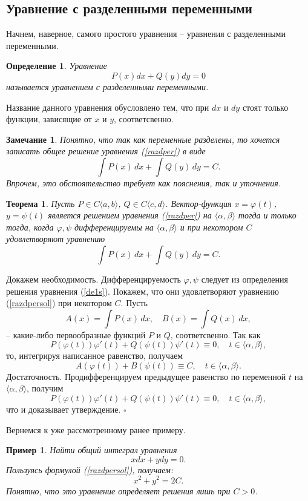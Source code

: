 \documentclass[a4paper,14pt]{extarticle}
\newtheorem{theorem}{Теорема}[subsection]
\newtheorem{definition}{Определение}[subsection]
\newtheorem{example}{Пример}[subsection]
\newtheorem{remark}{Замечание}[subsection]
\newcommand{\be}{\begin{equation}}
\newcommand{\ee}{\end{equation}}
\newcommand{\la}{\label}
\newenvironment{proof}%
{\begin{sloppypar}\noindent{\bf Доказательство.}}%
{\hspace*{\fill}$\square$\end{sloppypar}}
\begin{document}
\subsection{Уравнение с разделенными переменными}
Начнем, наверное, самого простого уравнения -- уравнения с разделенными переменными.
\begin{definition}
Уравнение 
\be\la{razdper}
P(x)dx + Q(y)dy = 0
\ee
называется уравнением с разделенными переменными.
\end{definition}
Название данного уравнения обусловлено тем, что при $dx$ и $dy$ стоят только функции, зависящие от $x$ и $y$, соответсвенно.
\begin{remark}
Понятно, что так как переменные разделены, то хочется записать общее решение уравнения (\ref{razdper}) в виде 
$$
\int P(x) \, dx + \int Q(y) \, dy = C.
$$	
Впрочем, это обстоятельство требует как пояснения, так и уточнения.
\end{remark}
\begin{theorem}
Пусть $P \in C \langle a, b \rangle$, $Q \in C \langle c, d \rangle$. Вектор-функция $x=\varphi(t)$, $y = \psi(t)$ является решением уравнения (\ref{razdper}) на $\langle \alpha, \beta \rangle$ тогда и только тогда, когда $\varphi, \psi$ дифференцируемы на $\langle \alpha, \beta \rangle$ и при некотором $C$ удовлетворяют уравнению
\be\la{razdpersol}
\int P(x) \, dx + \int Q(y) \, dy = C.
\ee	
\end{theorem}
\begin{proof}
Докажем необходимость. Дифференцируемость $\varphi, \psi$ следует из определения решения уравнения (\ref{de1s}). Покажем, что они удовлетворяют уравнению (\ref{razdpersol}) при некотором $C$. Пусть
$$
A(x) = \int P(x) \, dx, \quad B(x) = \int Q(x) \, dx,
$$
-- какие-либо первообразные функций $P$ и $Q$, соответсвенно. Так как
$$
P(\varphi(t))\varphi'(t) + Q(\psi(t))\psi'(t) \equiv 0, \quad t \in \langle \alpha, \beta \rangle,
$$
то, интегрируя написанное равенство, получаем
$$
A(\varphi(t)) + B(\psi(t)) \equiv C, \quad t \in \langle \alpha, \beta \rangle.
$$
Достаточность. Продифференцируем предыдущее равенство по переменной $t$ на $\langle \alpha, \beta \rangle$, получим
$$
P(\varphi(t))\varphi'(t) + Q(\psi(t))\psi'(t) \equiv 0, \quad t \in \langle \alpha, \beta \rangle,
$$
что и доказывает утверждение.
\end{proof}
Вернемся к уже рассмотренному ранее примеру.
\begin{example}
Найти общий интеграл уравнения
$$
xdx + ydy = 0.
$$
Пользуясь формулой (\ref{razdpersol}), получаем:
$$
x^2 + y^2 = 2C.
$$
Понятно, что это уравнение определяет решения лишь при $C > 0$.
\end{example}
\end{document}
